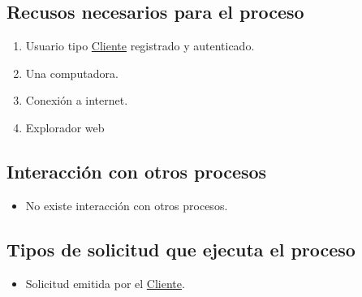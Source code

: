 	
\subsection{Recusos necesarios para el proceso}
	\begin{enumerate}
		\item Usuario tipo \hyperlink{Cliente}{Cliente} registrado y autenticado.
		\item Una computadora.
		\item Conexi\'on a internet.
		\item Explorador web
	\end{enumerate}
	
	
\subsection{Interacci\'on con otros procesos}
	\begin{itemize}
		\item No existe interacci\'on con otros procesos.
	\end{itemize}
	
	
\subsection{Tipos de solicitud que ejecuta el proceso}
	\begin{itemize}
		\item Solicitud emitida por el \hyperlink{Cliente}{Cliente}.
	\end{itemize}

\newpage	
